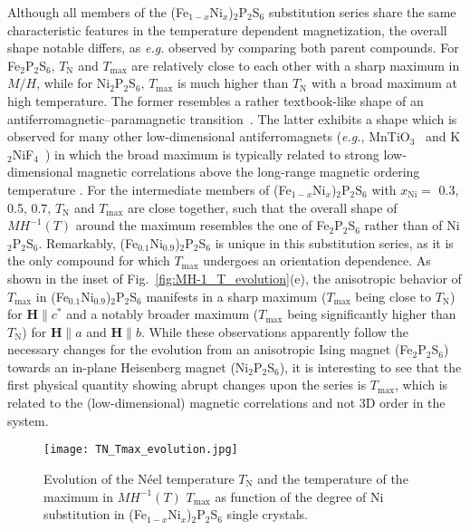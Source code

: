 \documentclass[twocolumn,superscriptaddress,prb,preprintnumbers,nobibnotes,aps]{revtex4-2}  %
\begin{document}
Although all members of the (Fe$_{1-x}$Ni$_x$)$_2$P$_2$S$_6$ substitution series share the same characteristic features in the temperature dependent magnetization, the overall shape notable differs, as \textit{e.g.} observed by comparing both parent compounds. For Fe$_2$P$_2$S$_6$, $T_\textrm{N}$ and $T_\textrm{max}$ are relatively close to each other with a sharp maximum in $M/H$, while for Ni$_2$P$_2$S$_6$, $T_\textrm{max}$ is much higher than $T_\textrm{N}$ with a broad maximum at high temperature. The former resembles a rather textbook-like shape of an antiferromagnetic--paramagnetic transition~\cite{Blundell2001}. The latter exhibits a shape which is observed for many other low-dimensional antiferromagnets (\textit{e.g.}, MnTiO$_3$~\cite{JAkimitsu1970} and K$_2$NiF$_4$~\cite{RBirgeneau1969}) in which the broad maximum is typically related to strong low-dimensional magnetic correlations above the long-range magnetic ordering temperature \cite{Lueken1999}. For the intermediate members of (Fe$_{1-x}$Ni$_x$)$_2$P$_2$S$_6$ with $x_\textrm{Ni} =$ 0.3, 0.5, 0.7, $T_\textrm{N}$ and $T_\textrm{max}$ are close together, such that the overall shape of $MH^{-1}(T)$ around the maximum resembles the one of Fe$_2$P$_2$S$_6$ rather than of Ni$_2$P$_2$S$_6$. Remarkably, (Fe$_{0.1}$Ni$_{0.9}$)$_2$P$_2$S$_6$ is unique in this substitution series, as it is the only compound for which $T_\textrm{max}$ undergoes an orientation dependence. As shown in the inset of Fig.~\ref{fig:MH-1_T_evolution}(e), the anisotropic behavior of $T_\textrm{max}$ in (Fe$_{0.1}$Ni$_{0.9}$)$_2$P$_2$S$_6$ manifests in a sharp maximum ($T_\textrm{max}$ being close to $T_\textrm{N}$) for $\boldsymbol{H} \parallel c^*$ and a notably broader maximum ($T_\textrm{max}$ being significantly higher than $T_\textrm{N}$) for $\boldsymbol{H} \parallel a$ and $\boldsymbol{H} \parallel b$. While these observations apparently follow the necessary changes for the evolution from an anisotropic Ising magnet (Fe$_2$P$_2$S$_6$) towards an in-plane Heisenberg magnet (Ni$_2$P$_2$S$_6$), it is interesting to see that the first physical quantity showing abrupt changes upon the series is $T_{\textrm{max}}$, which is related to the (low-dimensional) magnetic correlations and not 3D order in the system.

\begin{figure}[tb]
\texttt{[image: TN\_Tmax\_evolution.jpg]}
\caption{Evolution of the N\'eel temperature $T_\textrm{N}$ and the temperature of the maximum in $MH^{-1}(T)$ $T_\textrm{max}$ as function of the degree of Ni substitution in (Fe$_{1-x}$Ni$_x$)$_2$P$_2$S$_6$ single crystals.}
\label{fig:TN_Tmax}
\end{figure}
\end{document}
